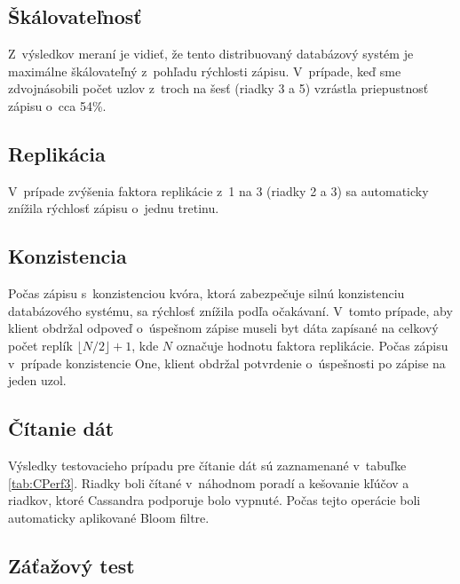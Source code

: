 \documentclass[11pt,twoside,a4paper]{book}
\begin{document}
\subsection*{Škálovateľnosť}

Z~výsledkov meraní je vidieť, že tento distribuovaný databázový systém je maximálne škálovateľný z~pohľadu rýchlosti zápisu. V~prípade, keď sme zdvojnásobili počet uzlov z~troch na šesť (riadky 3 a 5) vzrástla priepustnosť zápisu o~cca 54\%.

\subsection*{Replikácia}

V~prípade zvýšenia faktora replikácie z~1 na 3 (riadky 2 a 3) sa automaticky znížila rýchlosť zápisu o~jednu tretinu.

\subsection*{Konzistencia}

Počas zápisu s~konzistenciou kvóra, ktorá zabezpečuje silnú konzistenciu databázového systému, sa rýchlosť znížila podľa očakávaní. V~tomto prípade, aby klient obdržal odpoveď o~úspešnom zápise museli byt dáta zapísané na celkový počet replík $\lfloor N/2 \rfloor + 1$, kde $N$ označuje hodnotu faktora replikácie. Počas zápisu v~prípade konzistencie One, klient obdržal potvrdenie o~úspešnosti po zápise na jeden uzol.

\subsection*{Čítanie dát}

Výsledky testovacieho prípadu pre čítanie dát sú zaznamenané v~tabuľke \ref{tab:CPerf3}. Riadky boli čítané v~náhodnom poradí a kešovanie kľúčov a riadkov, ktoré Cassandra podporuje bolo vypnuté. Počas tejto operácie boli automaticky aplikované Bloom filtre.



\subsection*{Záťažový test}
\end{document}
